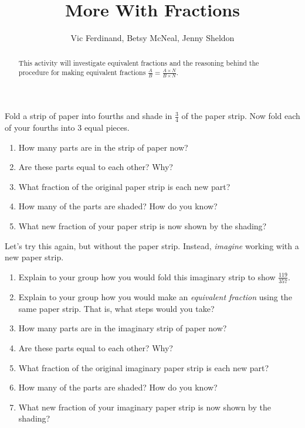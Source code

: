 \documentclass[nooutcomes]{ximera}
\title{More With Fractions}
\author{Vic Ferdinand, Betsy McNeal, Jenny Sheldon}
\begin{document}
\begin{abstract}
 This activity will investigate equivalent fractions and the reasoning behind the procedure for making equivalent fractions $\frac{A}{B} = \frac{A \times N}{B \times N}$.
\end{abstract}
\maketitle



\begin{problem} \label{MoreWithFractions1}
Fold a strip of paper into fourths and shade in $\frac{3}{4}$ of the paper strip. Now fold each of your fourths into 3 equal pieces.  
\begin{enumerate}
    \item   How many parts are in the strip of paper now?
    \item   Are these parts equal to each other?  Why?
    \item   What fraction of the original paper strip is each new part?
    \item   How many of the parts are shaded?  How do you know?
    \item   What new fraction of your paper strip is now shown by the shading?  
   
\end{enumerate}
\end{problem}

\begin{problem} \label{MoreWithFractions2}
 Let's try this again, but without the paper strip.  Instead, \emph{imagine} working with a new paper strip.  
\begin{enumerate}
    \item Explain to your group how you would fold this imaginary strip to show $\frac{119}{357}$.   
    \item Explain to your group how you would make an \emph{equivalent fraction} using the same paper strip.  That is, what steps would you take?
   \item   How many parts are in the imaginary strip of paper now?
    \item   Are these parts equal to each other?  Why?
    \item   What fraction of the original imaginary paper strip is each new part?
    \item   How many of the parts are shaded? How do you know?
    \item   What new fraction of your imaginary paper strip is now shown by the shading?  
\end{enumerate}
\end{problem}
\end{document}
